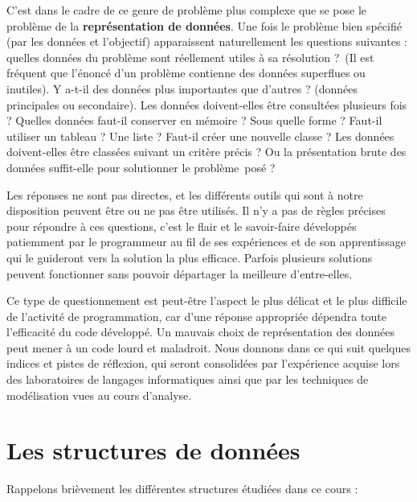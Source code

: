 {
C’est dans le cadre de ce genre de problème plus complexe que se pose le
problème de la \textbf{représentation de données}. Une fois le problème
bien spécifié (par les données et l’objectif) apparaissent
naturellement les questions suivantes : quelles données du problème
sont réellement utiles à sa résolution ?~(Il est fréquent que l’énoncé
d’un problème contienne des données superflues ou inutiles). Y a-t-il
des données plus importantes que d’autres ? (données principales ou
secondaire). Les données doivent-elles être consultées plusieurs fois ?
Quelles données faut-il conserver en mémoire ? Sous quelle forme ?
Faut-il utiliser un tableau ? Une liste ? Faut-il créer une nouvelle
classe ? Les données doivent-elles être classées suivant un critère
précis ? Ou la présentation brute des données suffit-elle pour
solutionner le problème~posé ?}

{
Les réponses ne sont pas directes, et les différents outils qui sont à
notre disposition peuvent être ou ne pas être utilisés. Il n’y a pas de
règles précises pour répondre à ces questions, c’est le flair et le
savoir-faire développés patiemment par le programmeur au fil de ses
expériences et de son apprentissage qui le guideront vers la solution
la plus efficace. Parfois plusieurs solutions peuvent fonctionner sans
pouvoir départager la meilleure d’entre-elles. }

{
Ce type de questionnement est peut-être l’aspect le plus délicat et le
plus difficile de l’activité de programmation, car d’une réponse
appropriée dépendra toute l’efficacité du code développé. Un mauvais
choix de représentation des données peut mener à un code lourd et
maladroit. Nous donnons dans ce qui suit quelques indices et pistes de
réflexion, qui seront consolidées par l’expérience acquise lors des
laboratoires de langages informatiques ainsi que par les techniques de
modélisation vues au cours d’analyse.}

\section[Les structures de données]{\bfseries Les structures de données}
{
Rappelons brièvement les différentes structures étudiées dans ce cours
:}

